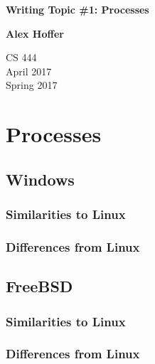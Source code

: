 \documentclass[letterpaper,10pt,titlepage]{article}
\begin{document}
\begin{titlepage}
    \begin{center}
        \vspace*{3.5cm}

        \textbf{Writing Topic \#1: Processes}

        \vspace{0.5cm}

        \textbf{Alex Hoffer}

        \vspace{0.8cm}

        CS 444\\
        April 2017\\
	Spring 2017\\

        \vfill

    \end{center}
\end{titlepage}

\newpage

\tableofcontents

\newpage

\section{Processes}
\cite{rus122} \cite{rus121} 
\cite{mck15} \cite{kerr10}
\subsection{Windows}

\subsubsection{Similarities to Linux}

\subsubsection{Differences from Linux}

\subsection{FreeBSD}

\subsubsection{Similarities to Linux}

\subsubsection{Differences from Linux}
\end{document}
